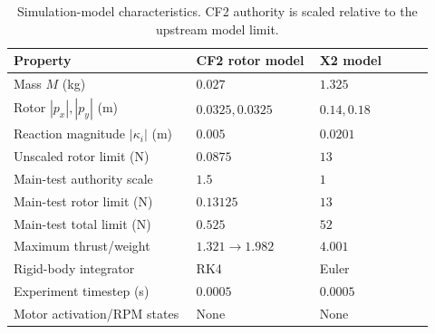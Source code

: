 \documentclass[letterpaper, 10 pt, conference]{ieeeconf}
\begin{document}
\begin{table}[t]
\centering
\caption{Simulation-model characteristics. CF2 authority is scaled relative to the upstream model limit.}
\label{tab:models}
\setlength{\tabcolsep}{3pt}
\footnotesize
\begin{tabular}{@{}p{0.40\linewidth}p{0.27\linewidth}p{0.25\linewidth}@{}}
\toprule
Property & CF2 rotor model & X2 model\\
\midrule
Mass $M$ (kg) & $0.027$ & $1.325$\\
Rotor $|p_x|,|p_y|$ (m) & $0.0325,0.0325$ & $0.14,0.18$\\
Reaction magnitude $|\kappa_i|$ (m) & $0.005$ & $0.0201$\\
Unscaled rotor limit (N) & $0.0875$ & $13$\\
Main-test authority scale & $1.5$ & $1$\\
Main-test rotor limit (N) & $0.13125$ & $13$\\
Main-test total limit (N) & $0.525$ & $52$\\
Maximum thrust/weight & $1.321\to1.982$ & $4.001$\\
Rigid-body integrator & RK4 & Euler\\
Experiment timestep (s) & $0.0005$ & $0.0005$\\
Motor activation/RPM states & None & None\\
\bottomrule
\end{tabular}
\end{table}
\end{document}
